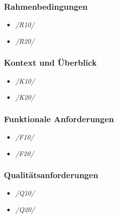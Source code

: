 \subsubsection{Rahmenbedingungen}

\begin{itemize}
    \item[] \emph{/R10/}
    \item[] \emph{/R20/}
\end{itemize}

\subsubsection{Kontext und Überblick}

\begin{itemize}
    \item[] \emph{/K10/}
    \item[] \emph{/K20/}
\end{itemize}

\subsubsection{Funktionale Anforderungen}

\begin{itemize}
    \item[] \emph{/F10/}
    \item[] \emph{/F20/}
\end{itemize}

\subsubsection{Qualitätsanforderungen}

\begin{itemize}
    \item[] \emph{/Q10/}
    \item[] \emph{/Q20/}
\end{itemize}
